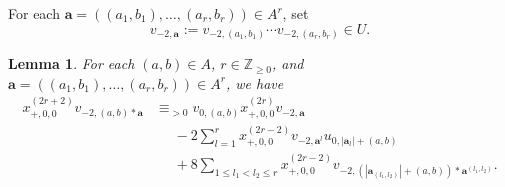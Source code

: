 \documentclass[12pt,a4paper]{amsart}
\newtheorem{lem}[thm]{Lemma}
\theoremstyle{definition}
\numberwithin{equation}{subsection}
\begin{document}
For each $\mathbf{a} = ((a_1,b_1),\dots,(a_r,b_r)) \in A^r$, set
\[
  v_{-2,\mathbf{a}} := v_{-2,(a_1,b_1)} \cdots v_{-2,(a_r,b_r)} \in U.
\]

\begin{lem}\label{lem: x2r+2 v-2b AI2}
  For each $(a,b) \in A$, $r \in \mathbb{Z}_{\geq 0}$, and $\mathbf{a} = ((a_1,b_1),\dots,(a_r,b_r)) \in A^r$, we have
  \begin{align*}
    x_{+,0,0}^{(2r+2)} v_{-2,(a,b)*\mathbf{a}}
    &\equiv_{>0} v_{0,(a,b)} x_{+,0,0}^{(2r)} v_{-2,\mathbf{a}}\\
    &\phantom{\equiv} -2 \sum_{l=1}^r x_{+,0,0}^{(2r-2)} v_{-2,\mathbf{a}^l} u_{0,|\mathbf{a}_l|+(a,b)}\\
    &\phantom{\equiv} + 8\sum_{1 \leq l_1 < l_2 \leq r} x_{+,0,0}^{(2r-2)} v_{-2,(|\mathbf{a}_{(l_1,l_2)}|+(a,b))*\mathbf{a}^{(l_1,l_2)}}.
  \end{align*}
\end{lem}
\end{document}
